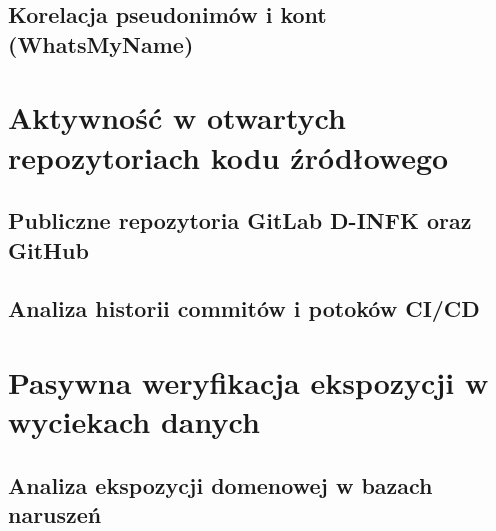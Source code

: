 \subsection{Korelacja pseudonimów i kont (WhatsMyName)}\label{subsec:korelacja-whatsmyname}

\section{Aktywność w otwartych repozytoriach kodu źródłowego}\label{sec:repozytoria-kodu}

\subsection{Publiczne repozytoria GitLab D-INFK oraz GitHub}\label{subsec:projekty-gitlab-github}

\subsection{Analiza historii commitów i potoków CI/CD}\label{subsec:analiza-commitow}

\section{Pasywna weryfikacja ekspozycji w wyciekach danych}\label{sec:wycieki-danych}

\subsection{Analiza ekspozycji domenowej w bazach naruszeń}\label{subsec:bazy-naruszen}

